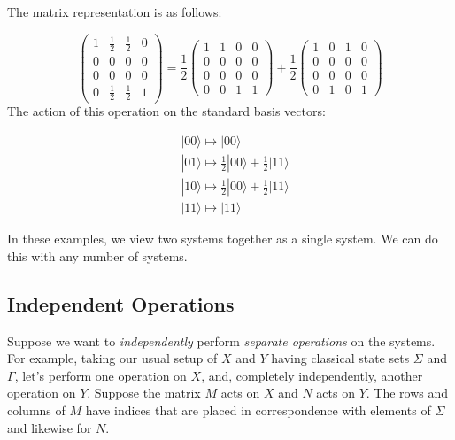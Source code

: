\documentclass[svgnames]{article}     %
\begin{document}
The matrix representation is as follows: 

\[
\begin{pmatrix}
  1 & \frac{1}{2} & \frac{1}{2} & 0 \\ 
  0 & 0 & 0 & 0 \\
  0 & 0 & 0 & 0 \\
  0 & \frac{1}{2} & \frac{1}{2} & 1 \end{pmatrix} = \frac{1}{2} \begin{pmatrix}
    1 & 1 & 0 & 0 \\
    0 & 0 & 0 & 0 \\
    0 & 0 & 0 & 0 \\
    0 & 0 & 1 & 1 
  \end{pmatrix} + \frac{1}{2} \begin{pmatrix}
    1 & 0 & 1 & 0 \\
    0 & 0 & 0 & 0 \\
    0 & 0 & 0 & 0 \\
    0 & 1 & 0 & 1
  \end{pmatrix} 
\] \vspace{5px}
The action of this operation on the standard basis vectors: 

\begin{align*}
  &|00\rangle \mapsto |00\rangle \\
  &|01\rangle \mapsto \frac{1}{2}|00\rangle + \frac{1}{2}|11\rangle \\
  &|10\rangle \mapsto \frac{1}{2}|00\rangle  + \frac{1}{2}|11\rangle \\
  &|11\rangle \mapsto |11\rangle 
\end{align*}

In these examples, we view two systems together as a single system. We can do
this with any number of systems. 

\subsection{Independent Operations}

Suppose we want to \textit{independently} perform \textit{separate
operations} on the systems. For example, taking our usual setup of $X$ and $Y$
having classical state sets $\Sigma$ and $\Gamma$, let's perform one operation
on $X$, and, completely independently, another operation on $Y$. Suppose the
matrix $M$ acts on $X$ and $N$ acts on $Y$. The rows and columns of $M$ have
indices that are placed in correspondence with elements of $\Sigma$ and
likewise for $N$. \\
\end{document}
